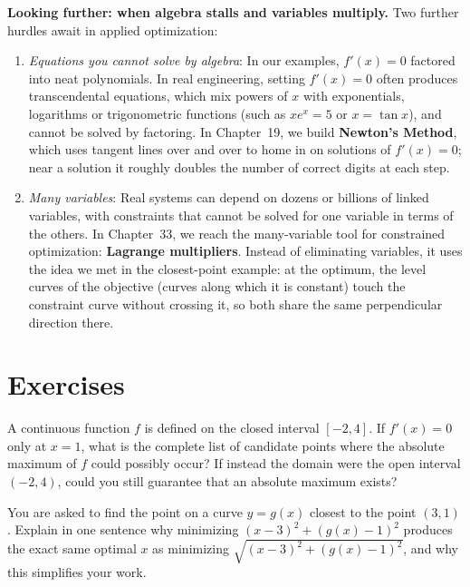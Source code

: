 \begin{connectionbox}
\textbf{Looking further: when algebra stalls and variables multiply.}
Two further hurdles await in applied optimization:
\begin{enumerate}
  \item \emph{Equations you cannot solve by algebra}: In our examples, $f'(x)=0$
    factored into neat polynomials. In real engineering, setting $f'(x)=0$ often
    produces transcendental equations, which mix powers of $x$ with exponentials,
    logarithms or trigonometric functions (such as $x e^x = 5$ or $x = \tan x$), and
    cannot be solved by factoring. In Chapter~19, we build \textbf{Newton's Method},
    which uses tangent lines over and over to home in on solutions of $f'(x)=0$;
    near a solution it roughly doubles the number of correct digits at each step.
  \item \emph{Many variables}: Real systems can depend on dozens or
    billions of linked variables, with constraints that cannot be solved for
    one variable in terms of the others. In Chapter~33, we reach the many-variable
    tool for constrained optimization: \textbf{Lagrange multipliers}. Instead of
    eliminating variables, it uses the idea we met in the closest-point example:
    at the optimum, the level curves of the objective (curves along which it is
    constant) touch the constraint curve without crossing it, so both share the same
    perpendicular direction there.
\end{enumerate}
\end{connectionbox}

\section{Exercises}

\begin{exercise}\label{ch17:ex-mental-checklist}
A continuous function $f$ is defined on the closed interval $[-2, 4]$. If $f'(x) = 0$
only at $x = 1$, what is the complete list of candidate points where the absolute
maximum of $f$ could possibly occur? If instead the domain were the open interval
$(-2, 4)$, could you still guarantee that an absolute maximum exists?
\end{exercise}

\begin{exercise}\label{ch17:ex-mental-squaring}
You are asked to find the point on a curve $y = g(x)$ closest to the point $(3, 1)$.
Explain in one sentence why minimizing $(x - 3)^2 + (g(x) - 1)^2$ produces the exact same
optimal $x$ as minimizing $\sqrt{(x - 3)^2 + (g(x) - 1)^2}$, and why this simplifies your
work.
\end{exercise}

